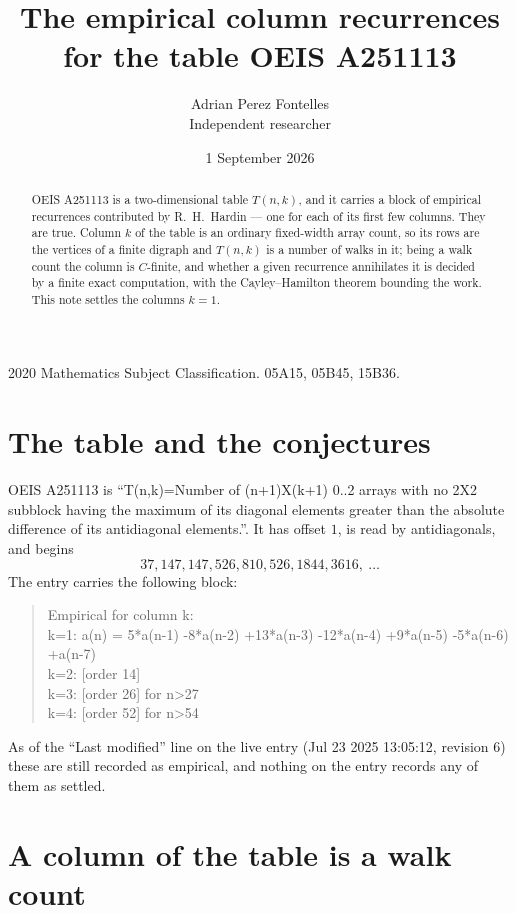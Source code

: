 \documentclass[11pt,a4paper]{article}
\title{The empirical column recurrences for the table OEIS A251113}
\author{Adrian Perez Fontelles\\ \small Independent researcher}
\date{1 September 2026}
\theoremstyle{plain}
\theoremstyle{definition}
\begin{document}
\maketitle

\begin{abstract}
OEIS A251113 is a two-dimensional table $T(n,k)$, and it carries a block of empirical
recurrences contributed by R.~H.~Hardin --- one for each of its first few columns. They are
true. Column $k$ of the table is an ordinary fixed-width array count, so its rows are the
vertices of a finite digraph and $T(n,k)$ is a number of walks in it; being a walk count the
column is $C$-finite, and whether a given recurrence annihilates it is decided by a finite
exact computation, with the Cayley--Hamilton theorem bounding the work. This note settles the columns $k=1$.
\end{abstract}

\noindent\small 2020 Mathematics Subject Classification. 05A15, 05B45, 15B36.\normalsize

\section{The table and the conjectures}

OEIS A251113 is ``T(n,k)=Number of (n+1)X(k+1) 0..2 arrays with no 2X2 subblock having the maximum of its diagonal elements greater than the absolute difference of its antidiagonal elements.''. It has offset $1$, is
read by antidiagonals, and begins
\[
37, 147, 147, 526, 810, 526, 1844, 3616,\ \dots
\]
The entry carries the following block:
\begin{quote}\small
Empirical for column k:\\
k=1: a(n) = 5*a(n-1) -8*a(n-2) +13*a(n-3) -12*a(n-4) +9*a(n-5) -5*a(n-6) +a(n-7)\\
k=2: [order 14]\\
k=3: [order 26] for n>27\\
k=4: [order 52] for n>54\\
\end{quote}
As of the ``Last modified'' line on the live entry (Jul 23 2025 13:05:12, revision 6) these are still
recorded as empirical, and nothing on the entry records any of them as settled.

\section{A column of the table is a walk count}
\end{document}
